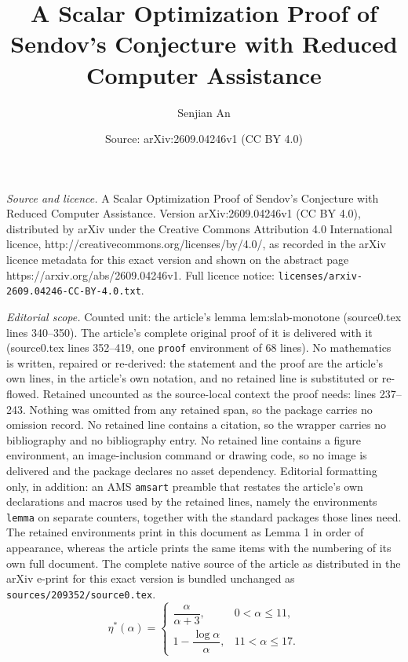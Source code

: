 \documentclass[10pt,a4paper]{amsart}
\title{A Scalar Optimization Proof of Sendov's Conjecture with Reduced Computer Assistance}
\author{Senjian An}
\date{Source: arXiv:2609.04246v1 (CC BY 4.0)}
\newcommand{\etaStar}{\eta^{\ast}}
\begin{document}
\maketitle

\noindent\emph{Source and licence.} A Scalar Optimization Proof of Sendov's Conjecture with Reduced Computer Assistance. Version arXiv:2609.04246v1 (CC BY 4.0), distributed by arXiv under the Creative Commons Attribution 4.0 International licence, http://creativecommons.org/licenses/by/4.0/, as recorded in the arXiv licence metadata for this exact version and shown on the abstract page https://arxiv.org/abs/2609.04246v1. Full licence notice: \texttt{licenses/arxiv-2609.04246-CC-BY-4.0.txt}.\par\smallskip

\noindent\textit{Editorial scope.} Counted unit: the article's lemma lem:slab-monotone (source0.tex lines 340--350). The article's complete original proof of it is delivered with it (source0.tex lines 352--419, one \texttt{proof} environment of 68 lines). No mathematics is written, repaired or re-derived: the statement and the proof are the article's own lines, in the article's own notation, and no retained line is substituted or re-flowed.  Retained uncounted as the source-local context the proof needs: lines 237--243.  Nothing was omitted from any retained span, so the package carries no omission record.  No retained line contains a citation, so the wrapper carries no bibliography and no bibliography entry.  No retained line contains a figure environment, an image-inclusion command or drawing code, so no image is delivered and the package declares no asset dependency.  Editorial formatting only, in addition: an AMS \texttt{amsart} preamble that restates the article's own declarations and macros used by the retained lines, namely the environments \texttt{lemma} on separate counters, together with the standard packages those lines need.  The retained environments print in this document as Lemma 1 in order of appearance, whereas the article prints the same items with the numbering of its own full document.  The complete native source of the article as distributed in the arXiv e-print for this exact version is bundled unchanged as \texttt{sources/209352/source0.tex}.
\begin{equation}\label{eq:eta-star}
 \etaStar(\alpha)=
 \begin{cases}
 \dfrac{\alpha}{\alpha+3},&0<\alpha\le11,\\[2mm]
 1-\dfrac{\log\alpha}{\alpha},&11<\alpha\le17.
 \end{cases}
\end{equation}
\end{document}
